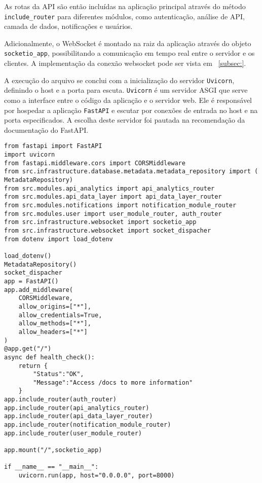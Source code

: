As rotas da \gls{API} são então incluídas na aplicação principal através do método \texttt{include\_router} para diferentes módulos, como autenticação, análise de API, camada de dados, notificações e usuários.

Adicionalmente, o WebSocket é montado na raiz da aplicação através do objeto \texttt{socketio\_app}, possibilitando a comunicação em tempo real entre o servidor e os clientes. A implementação da conexão websocket pode ser vista em ~\ref{subsec:}.%


A execução do arquivo se conclui com a inicialização do servidor \texttt{Uvicorn}, definindo o host e a porta para escuta. \texttt{Uvicorn} é um servidor \gls{ASGI} que serve como a interface entre o código da aplicação e o servidor web. Ele é responsável por hospedar a aplicação \texttt{FastAPI} e escutar por conexões de entrada no host e na porta especificados. A escolha deste servidor foi pautada na recomendação da documentação do FastAPI.%

\begin{verbatim}
from fastapi import FastAPI
import uvicorn
from fastapi.middleware.cors import CORSMiddleware
from src.infrastructure.database.metadata.metadata_repository import (
MetadataRepository)
from src.modules.api_analytics import api_analytics_router
from src.modules.api_data_layer import api_data_layer_router
from src.modules.notifications import notification_module_router
from src.modules.user import user_module_router, auth_router
from src.infrastructure.websocket import socketio_app
from src.infrastructure.websocket import socket_dispacher
from dotenv import load_dotenv

load_dotenv()
MetadataRepository()
socket_dispacher
app = FastAPI()
app.add_middleware(
    CORSMiddleware,
    allow_origins=["*"],
    allow_credentials=True,
    allow_methods=["*"],
    allow_headers=["*"]
)
@app.get("/")
async def health_check():
    return {
        "Status":"OK",
        "Message":"Access /docs to more information"    
    }
app.include_router(auth_router)
app.include_router(api_analytics_router)
app.include_router(api_data_layer_router)
app.include_router(notification_module_router)
app.include_router(user_module_router)

app.mount("/",socketio_app)

if __name__ == "__main__":
    uvicorn.run(app, host="0.0.0.0", port=8000)
\end{verbatim}

